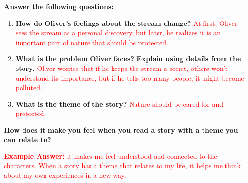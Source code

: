 \documentclass[12pt]{article}
\begin{document}
\begin{tcolorbox}[colframe=black!60, colback=white, 
coltitle=black, colbacktitle=black!15, fonttitle=\bfseries\Large, 
title=Independent Practice: \textit{Oliver’s Discovery}, halign title=center, left=10pt, right=10pt, top=10pt, bottom=15pt]

\textbf{Answer the following questions:}
\begin{enumerate}[itemsep=1em]
    \item \textbf{How do Oliver’s feelings about the stream change?}  
    \textcolor{red}{At first, Oliver sees the stream as a personal discovery, but later, he realizes it is an important part of nature that should be protected.}  

    \item \textbf{What is the problem Oliver faces? Explain using details from the story.}  
    \textcolor{red}{Oliver worries that if he keeps the stream a secret, others won’t understand its importance, but if he tells too many people, it might become polluted.}  

    \item \textbf{What is the theme of the story?}  
    \textcolor{red}{Nature should be cared for and protected.}  
\end{enumerate}
\end{tcolorbox}

\vspace{1em}

\begin{tcolorbox}[colframe=black!60, colback=white, 
coltitle=black, colbacktitle=black!15, fonttitle=\bfseries\Large, 
title=Exit Ticket, halign title=center, left=10pt, right=10pt, top=10pt, bottom=15pt]

\textbf{How does it make you feel when you read a story with a theme you can relate to?}  

\textcolor{red}{\textbf{Example Answer:} It makes me feel understood and connected to the characters. When a story has a theme that relates to my life, it helps me think about my own experiences in a new way.}
\end{tcolorbox}
\end{document}

